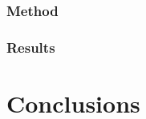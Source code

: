 \documentclass{kththesis}
\begin{document}
\subsection{Method}
\subsection{Results}

\chapter{Conclusions}

\printbibliography[heading=bibintoc]

\appendix


\tailmatter
\end{document}
